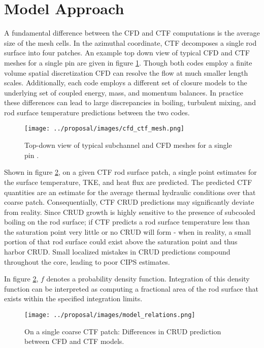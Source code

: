 
\section{Model Approach}

A fundamental difference between the CFD and CTF computations is the average size of the mesh cells.  In the azimuthal coordinate, CTF decomposes a single rod surface into four patches.  An example top down view of typical CFD and CTF meshes for a single pin are given in figure \ref{fig:cfd_ctf_mesh}.  Though both codes employ a finite volume spatial discretization CFD can resolve the flow at much smaller length scales.  Additionally, each code employs a different set of closure models to the underlying set of coupled energy, mass, and momentum balances.  In practice these differences can lead to large discrepancies in boiling, turbulent mixing, and rod surface temperature predictions between the two codes.

\begin{figure}[!htbp]
    \centering
    \texttt{[image: ../proposal/images/cfd\_ctf\_mesh.png]}
    \caption{Top-down view of typical subchannel and CFD meshes for a single pin \cite{salko12}.}
    \label{fig:cfd_ctf_mesh}
\end{figure}

Shown in figure \ref{fig:model_overview}, on a given CTF rod surface patch, a single point estimates for the surface temperature, TKE, and heat flux are predicted.  The predicted CTF quantities are an estimate for the average thermal hydraulic conditions over that coarse patch.   Consequentially, CTF CRUD predictions may significantly deviate from reality.  Since CRUD growth is highly sensitive to the presence of subcooled boiling on the rod surface; if CTF predicts a rod surface temperature less than the saturation point very little or no CRUD will form - when in reality, a small portion of that rod surface could exist above the saturation point and thus harbor CRUD.  Small localized mistakes in CRUD predictions compound throughout the core, leading to poor CIPS estimates. 

In figure \ref{fig:model_overview}, $f$ denotes a probability density function.  Integration of this density function can be interpreted as computing a fractional area of the rod surface that exists within the specified integration limits.  
\begin{figure}[!htbp]
    \centering
    \texttt{[image: ../proposal/images/model\_relations.png]}
    \caption{On a single coarse CTF patch: Differences in CRUD prediction between CFD and CTF models.}
    \label{fig:model_overview}
\end{figure}

